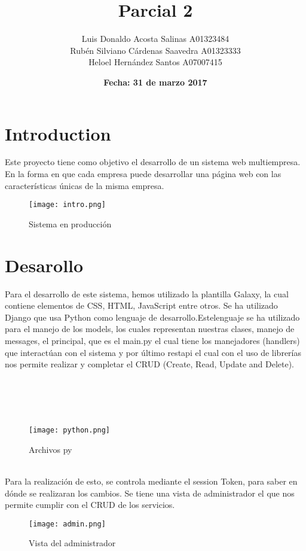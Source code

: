 \documentclass{article}
\title{Parcial 2}
\author{Luis Donaldo Acosta Salinas A01323484\\ Rubén Silviano Cárdenas Saavedra A01323333\\ Heloel Hernández Santos A07007415 }
\date{\textbf {Fecha: 31 de marzo 2017}}
\begin{document}
\maketitle

\section{Introduction}
Este proyecto tiene como objetivo el desarrollo de un sistema web multiempresa. En la forma en que cada empresa puede desarrollar una página web con las características únicas de la misma empresa.

\begin{figure}[h!]
\centering
\texttt{[image: intro.png]}
\caption{Sistema en producción}
\label{fig:admin}
\end{figure}

\section{Desarollo}
Para el desarrollo de este sistema, hemos utilizado la plantilla Galaxy, la cual contiene elementos de CSS, HTML, JavaScript entre otros. Se ha utilizado Django que usa Python como lenguaje de desarrollo.Estelenguaje se ha utilizado para el manejo de los models, los cuales representan nuestras clases, manejo de messages, el principal, que es el main.py el cual tiene los manejadores (handlers) que interactúan con el sistema y por último restapi el cual con el uso de librerías nos permite realizar y completar el CRUD (Create, Read, Update and Delete).
\\  \\ \\ \\ \\

\begin{figure}[h!]
\centering
\texttt{[image: python.png]}
\caption{Archivos py}
\label{fig:archivos}
\end{figure}
\\
Para la realización de esto, se controla mediante el session Token, para saber en dónde se realizaran los cambios. Se tiene una vista de administrador el que nos permite cumplir con el CRUD de los servicios. 

\begin{figure}[h!]
\centering
\texttt{[image: admin.png]}
\caption{Vista del administrador}
\label{fig:admin}
\end{figure}
\end{document}
